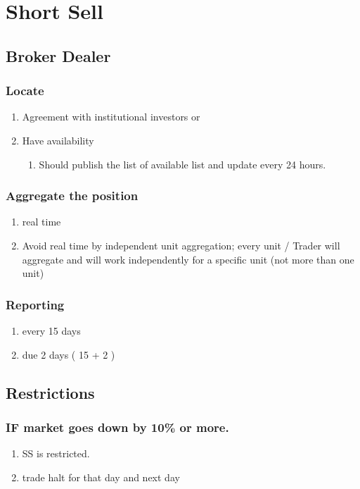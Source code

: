 \documentclass[11pt]{article}
\begin{document}
\section{Short Sell}
\label{sec:orgaebd80d}
\subsection{Broker Dealer}
\label{sec:org852888d}
\subsubsection{Locate}
\label{sec:org97e3dbc}
\begin{enumerate}
\item Agreement with institutional investors
\label{sec:org0f4342d}
or
\item Have availability
\label{sec:org5acba9d}
\begin{enumerate}
\item Should publish the list of available list and update every 24 hours.
\label{sec:org46bb7f2}
\end{enumerate}
\end{enumerate}
\subsubsection{Aggregate the position}
\label{sec:orga9e3887}
\begin{enumerate}
\item real time
\label{sec:orgb13eb3a}
\item Avoid real time by independent unit aggregation; every unit / Trader will aggregate and will work independently for a specific unit (not more than one unit)
\label{sec:orgc0af684}
\end{enumerate}
\subsubsection{Reporting}
\label{sec:org4c5ddbd}
\begin{enumerate}
\item every 15 days
\label{sec:org7bab254}
\item due 2 days ( 15 + 2 )
\label{sec:orga0ea6a8}
\end{enumerate}
\subsection{Restrictions}
\label{sec:orgb9fb8af}
\subsubsection{IF market goes down by 10\% or more.}
\label{sec:org408c2e5}
\begin{enumerate}
\item SS is restricted.
\label{sec:orgb2284b8}
\item trade halt for that day and next day
\label{sec:orgac9b27c}
\end{enumerate}
\end{document}
